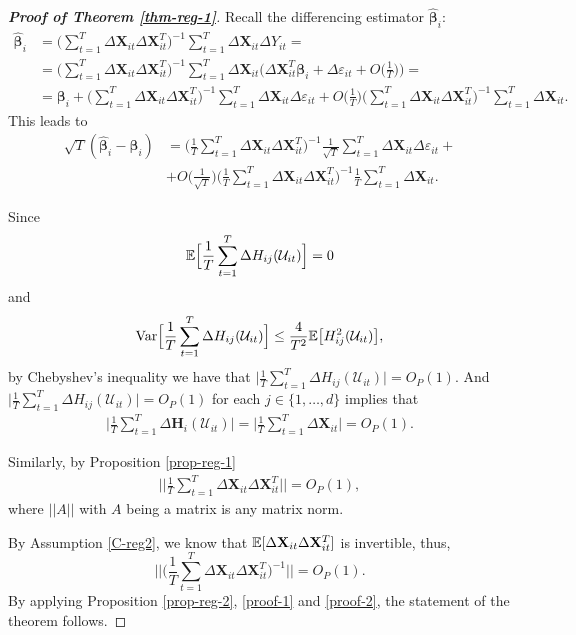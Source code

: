 \documentclass[a4paper,12pt]{article}
\begin{document}
\begin{proof}[\textnormal{\textbf{Proof of Theorem \ref{thm-reg-1}}}]
Recall the differencing estimator $\widehat{\bm{\beta}}_i$:
\begin{align*}
\widehat{\bm{\beta}}_i &= \Big( \sum_{t=1}^T \Delta \mathbf{X}_{it} \Delta \mathbf{X}_{it}^T \Big)^{-1} \sum_{t=1}^T \Delta \mathbf{X}_{it} \Delta Y_{it} =\\
& =  \Big( \sum_{t=1}^T \Delta \mathbf{X}_{it} \Delta \mathbf{X}_{it}^T \Big)^{-1} \sum_{t=1}^T \Delta \mathbf{X}_{it} \bigg(\Delta \mathbf{X}_{it}^T \bm{\beta}_i + \Delta \varepsilon_{it} + O\Big(\frac{1}{T}\Big) \bigg) =\\
&= \bm{\beta}_i +  \Big( \sum_{t=1}^T \Delta \mathbf{X}_{it} \Delta \mathbf{X}_{it}^T \Big)^{-1} \sum_{t=1}^T \Delta \mathbf{X}_{it} \Delta \varepsilon_{it}
+  O\Big(\frac{1}{T}\Big) \Big( \sum_{t=1}^T \Delta \mathbf{X}_{it} \Delta \mathbf{X}_{it}^T \Big)^{-1} \sum_{t=1}^T \Delta \mathbf{X}_{it}. 
\end{align*}
This leads to
\begin{align*}
\sqrt{T}( \widehat{\bm{\beta}}_i - \bm{\beta}_i) &=  \Big(\frac{1}{T} \sum_{t=1}^T \Delta \mathbf{X}_{it} \Delta \mathbf{X}_{it}^T \Big)^{-1}\frac{1}{\sqrt{T}} \sum_{t=1}^T \Delta \mathbf{X}_{it} \Delta \varepsilon_{it} +\\
&+  O\Big(\frac{1}{\sqrt{T}}\Big) \Big( \frac{1}{T}\sum_{t=1}^T \Delta \mathbf{X}_{it} \Delta \mathbf{X}_{it}^T \Big)^{-1} \frac{1}{T}\sum_{t=1}^T \Delta \mathbf{X}_{it}.
\end{align*}

Since 
\[\mathbb{E} \Big[ \frac{1}{T}\sum_{t=1}^T \Delta H_{ij}(\mathcal{U}_{it})\Big] = 0\]
and 
\[\textnormal{Var} \Big[ \frac{1}{T}\sum_{t=1}^T \Delta H_{ij}(\mathcal{U}_{it})\Big] \leq \frac{4}{T^2} \mathbb{E}\big[H_{ij}^2(\mathcal{U}_{it})\big],\]
by Chebyshev's inequality we have that $\Big|\frac{1}{T}\sum_{t=1}^T \Delta H_{ij}(\mathcal{U}_{it})\Big| = O_P(1)$. And $\Big|\frac{1}{T}\sum_{t=1}^T \Delta H_{ij}(\mathcal{U}_{it})\Big| = O_P(1)$ for each $j\in\{1, \ldots, d\} $ implies that
\begin{align}\label{proof-1}
\Big|\frac{1}{T}\sum_{t=1}^T \Delta \mathbf{H}_i (\mathcal{U}_{it}) \Big| = \Big| \frac{1}{T}\sum_{t=1}^T \Delta \mathbf{X}_{it}\Big| = O_P(1).
\end{align}


Similarly, by Proposition \ref{prop-reg-1}
\begin{align}\label{proof-2}
\Big|\Big|\frac{1}{T}\sum_{t=1}^T\Delta \mathbf{X}_{it} \Delta \mathbf{X}_{it}^T\Big|\Big| = O_P(1),
\end{align}
where $||A||$ with $A$ being a matrix is any matrix norm.

By Assumption \ref{C-reg2}, we know that $\mathbb{E} [\Delta \mathbf{X}_{it} \Delta \mathbf{X}_{it}^T]$ is invertible, thus, 
\[\Bigg| \Bigg| \Big(\frac{1}{T}\sum_{t=1}^T\Delta \mathbf{X}_{it} \Delta \mathbf{X}_{it}^T\Big)^{-1}\Bigg|\Bigg| = O_P(1).\]
By applying Proposition \ref{prop-reg-2}, \eqref{proof-1} and \eqref{proof-2}, the statement of the theorem follows.
\end{proof}
\end{document}
